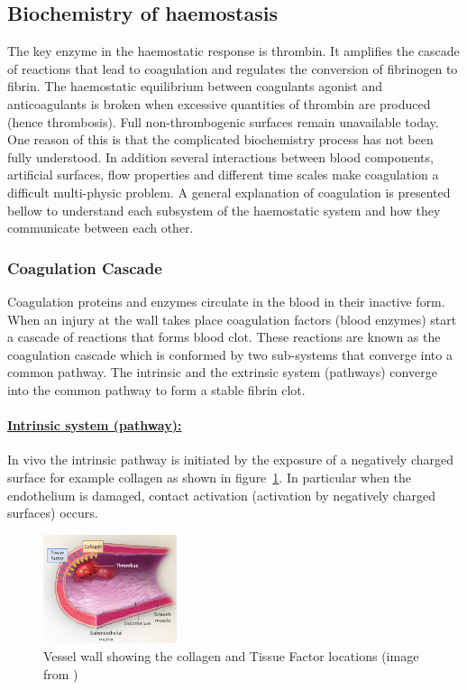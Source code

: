 \documentclass[%
 nofootinbib,
 amsmath,amssymb,
 aps,
 pra,
]{revtex4-1}
\begin{document}
\subsection{ \label{sec:chemical} Biochemistry of haemostasis}
The key enzyme in the haemostatic response is thrombin. It amplifies the cascade of reactions that lead to coagulation and regulates the conversion of fibrinogen to fibrin. The haemostatic equilibrium between coagulants agonist and anticoagulants is broken when excessive quantities of thrombin are produced (hence thrombosis). Full non-thrombogenic  surfaces remain unavailable today. One reason of this is that the complicated biochemistry process has not been fully understood. In addition several interactions between blood components, artificial surfaces, flow properties and different time scales make coagulation a difficult multi-physic problem. A general explanation of coagulation is presented bellow to understand each subsystem of the haemostatic system and how they communicate between each other.
\subsubsection{Coagulation Cascade}
Coagulation proteins and enzymes circulate in the blood in their inactive form. When an injury at the wall takes place coagulation factors (blood enzymes) start a cascade of reactions that forms blood clot. These reactions are known as the coagulation cascade which is conformed by two sub-systems that converge into a common pathway. The intrinsic and the extrinsic system (pathways) converge into the common pathway to form a stable fibrin clot.\\

\paragraph{\underline{Intrinsic system (pathway):}}
In vivo the intrinsic pathway is initiated by the exposure of a negatively charged surface for example collagen as shown in figure~\ref{sec:fur}. In particular when the endothelium is damaged, contact activation (activation by negatively charged surfaces) occurs.\\ 
\begin{figure}[h!]
\includegraphics[width=0.35\textwidth]{Figures/Furie.png}
\caption{\label{sec:fur} Vessel wall showing the collagen and Tissue Factor locations (image from \citet{Furie:2008})}
\end{figure}
\end{document}
